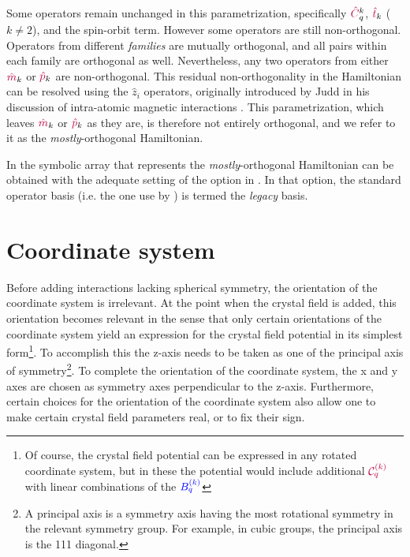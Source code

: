 \documentclass[11pt, twoside,openright]{article}
\begin{document}
Some operators remain unchanged in this parametrization, specifically $\textcolor{purple}{\hat{C}}_q^k$, $\textcolor{purple}{\hat{t}}_k$ ($k\neq2$), and the spin-orbit term. However some operators are still non-orthogonal. Operators from different \textit{families} are mutually orthogonal, and all pairs within each family are orthogonal as well. Nevertheless, any two operators from either $\textcolor{purple}{\hat{m}}_k$ or $\textcolor{purple}{\hat{p}}_k$ are non-orthogonal. This residual non-orthogonality in the Hamiltonian can be resolved using the $\hat{z}_i$ operators, originally introduced by Judd in his discussion of intra-atomic magnetic interactions \cite{judd_intra-atomic_1968}. This parametrization, which leaves $\textcolor{purple}{\hat{m}}_k$ or $\textcolor{purple}{\hat{p}}_k$ as they are, is therefore not entirely orthogonal, and we refer to it as the \textit{mostly}-orthogonal Hamiltonian. 

In \qlanth the symbolic array that represents the \textit{mostly}-orthogonal Hamiltonian can be obtained with the adequate setting of the option  in . In that option, the standard operator basis (i.e. the one use by \bill) is termed the \textit{legacy} basis.



\section{Coordinate system}\label{section:coord-sys}

Before adding interactions lacking spherical symmetry, the orientation of the coordinate system is irrelevant. At the point when the crystal field is added, this orientation becomes relevant in the sense that only certain orientations of the coordinate system yield an expression for the crystal field potential in its simplest form\footnote{Of course, the crystal field potential can be expressed in any rotated coordinate system, but in these the potential would include additional $\textcolor{purple}{\mathcal{C}^{(k)}_{q}}$ with linear combinations of the $\textcolor{blue}{B^{(k)}_{q}}$}. To accomplish this the z-axis needs to be taken as one of the principal axis of symmetry\footnote{A principal axis is a symmetry axis having the most rotational symmetry in the relevant symmetry group. For example, in cubic groups, the principal axis is the 111 diagonal.}. To complete the orientation of the coordinate system, the x and y axes are chosen as symmetry axes perpendicular to the z-axis. Furthermore, certain choices for the orientation of the coordinate system also allow one to make certain crystal field parameters real, or to fix their sign.
\end{document}
